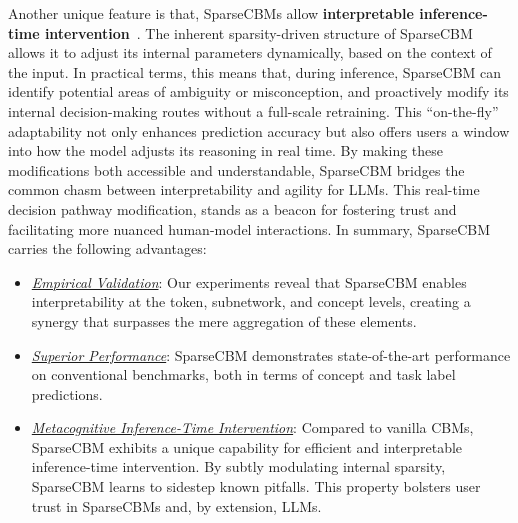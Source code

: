 \documentclass[letterpaper]{article} %
\begin{document}
Another unique feature is that, SparseCBMs allow \textbf{interpretable inference-time intervention}~\citep{koh2020concept,li2023inference}. The inherent sparsity-driven structure of SparseCBM allows it to adjust its internal parameters dynamically, based on the context of the input. In practical terms, this means that, during inference, SparseCBM can identify potential areas of ambiguity or misconception, and proactively modify its internal decision-making routes without a full-scale retraining. This ``on-the-fly'' adaptability not only enhances prediction accuracy but also offers users a window into how the model adjusts its reasoning in real time. By making these modifications both accessible and understandable, SparseCBM bridges the common chasm between interpretability and agility for LLMs. This real-time decision pathway modification,
stands as a beacon for fostering trust and facilitating more nuanced human-model interactions. In summary, SparseCBM carries the following advantages:
\begin{itemize}
    \item \underline{\textit{Empirical Validation}}: Our experiments reveal that SparseCBM enables interpretability at the token, subnetwork, and concept levels, creating a synergy that surpasses the mere aggregation of these elements.
    \item \underline{\textit{Superior Performance}}: SparseCBM demonstrates state-of-the-art performance on conventional benchmarks, both in terms of concept and task label predictions.
    \item \underline{\textit{Metacognitive Inference-Time Intervention}}: Compared to vanilla CBMs, SparseCBM exhibits a unique capability for efficient and interpretable inference-time intervention. By subtly modulating internal sparsity, SparseCBM learns to sidestep known pitfalls. This property bolsters user trust in SparseCBMs and, by extension, LLMs.

\end{itemize}
\end{document}

